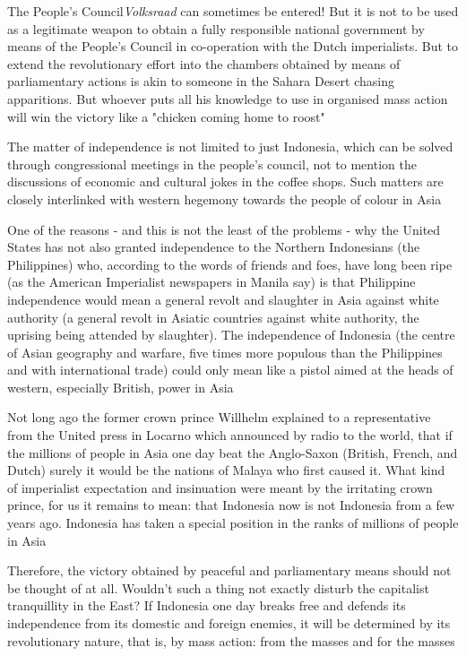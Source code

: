 The People's Council\emph{Volksraad} can sometimes be entered! But it is not to be used as a legitimate weapon 
to obtain a fully responsible national government by means of the People's Council in 
co-operation with the Dutch imperialists. But to extend the revolutionary effort into 
the chambers obtained by means of parliamentary actions is akin to someone in the Sahara Desert 
chasing apparitions. But whoever puts all his knowledge to use in organised mass action will win 
the victory like a "chicken coming home to roost"\nline

The matter of independence is not limited to just Indonesia, which can be solved through congressional meetings 
in the people's council, not to mention the discussions of economic and cultural jokes in the coffee shops. 
Such matters are closely interlinked with western hegemony towards the people of colour in Asia\nline

One of the reasons - and this is not the least of the problems - why the United States has not also granted independence 
to the Northern Indonesians (the Philippines) who, according to the words of friends and foes, have long been ripe 
(as the American Imperialist newspapers in Manila say) is that Philippine independence would mean a general revolt and slaughter in 
Asia against white authority (a general revolt in Asiatic countries against white authority, the uprising being attended by slaughter). 
The independence of Indonesia (the centre of Asian geography and warfare, five times more populous than the Philippines 
and with international trade) could only mean like a pistol aimed at the heads of western, especially British, power in Asia\nline

Not long ago the former crown prince Willhelm explained to a representative from the United press 
in Locarno which announced by radio to the world, that if the millions of people in Asia one day beat 
the Anglo-Saxon (British, French, and Dutch) surely it would be the nations of Malaya who first caused it. 
What kind of imperialist expectation and insinuation were meant by the irritating crown prince, for us 
it remains to mean: that Indonesia now is not Indonesia from a few years ago. Indonesia has taken a special 
position in the ranks of millions of people in Asia\nline

Therefore, the victory obtained by peaceful and parliamentary means should not be thought of at all. 
Wouldn't such a thing not exactly disturb the capitalist tranquillity in the East? If Indonesia one day 
breaks free and defends its independence from its domestic and foreign enemies, it will be determined by its 
revolutionary nature, that is, by mass action: from the masses and for the masses\nline

